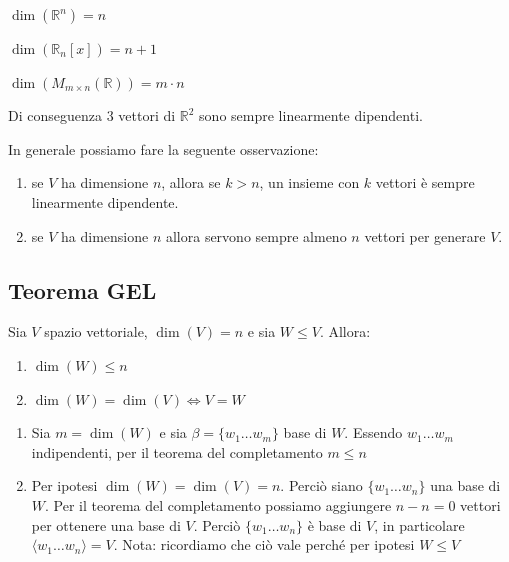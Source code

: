\documentclass[
  a4paper,
]{article}
\providecommand{\tightlist}{%
  \setlength{\itemsep}{0pt}\setlength{\parskip}{0pt}}
\providecommand{\tightlist}{}
\begin{document}
\begin{examplebox}
\(\dim(\mathbb{R}^n) = n\)

\(\dim(\mathbb{R}_n[x]) = n + 1\)

\(\dim(M_{m\times n}(\mathbb{R})) = m \cdot n\)
\end{examplebox}

Di conseguenza 3 vettori di \(\mathbb{R}^2\) sono sempre linearmente
dipendenti.

In generale possiamo fare la seguente osservazione:

\begin{observationbox}
\begin{enumerate}
\def\labelenumi{\arabic{enumi}.}
\tightlist
\item
  se \(V\) ha dimensione \(n\), allora se \(k > n\), un insieme con
  \(k\) vettori è sempre linearmente dipendente.
\item
  se \(V\) ha dimensione \(n\) allora servono sempre almeno \(n\)
  vettori per generare \(V\).
\end{enumerate}
\end{observationbox}

\hypertarget{teorema-gel}{%
\subsection{Teorema GEL}\label{teorema-gel}}

\begin{propositionbox}
Sia \(V\) spazio vettoriale, \(\dim(V) = n\) e sia \(W \leq V\). Allora:

\begin{enumerate}
\def\labelenumi{\arabic{enumi}.}
\tightlist
\item
  \(\dim(W) \leq n\)
\item
  \(\dim(W) = \dim(V) \iff V = W\)
\end{enumerate}
\end{propositionbox}

\begin{proofbox}
\begin{enumerate}
\def\labelenumi{\arabic{enumi}.}
\tightlist
\item
  Sia \(m = \dim(W)\) e sia \(\beta = \{w_1 \dots w_m\}\) base di \(W\).
  Essendo \(w_1 \dots w_m\) indipendenti, per il teorema del
  completamento \(m \leq n\)
\item
  Per ipotesi \(\dim(W) = \dim(V) = n\). Perciò siano
  \(\{w_1 \dots w_n\}\) una base di \(W\). Per il teorema del
  completamento possiamo aggiungere \(n - n = 0\) vettori per ottenere
  una base di \(V\). Perciò \(\{w_1 \dots w_n\}\) è base di \(V\), in
  particolare \(\langle w_1 \dots w_n\rangle = V\). Nota: ricordiamo che
  ciò vale perché per ipotesi \(W \leq V\)
\end{enumerate}
\end{proofbox}
\end{document}
